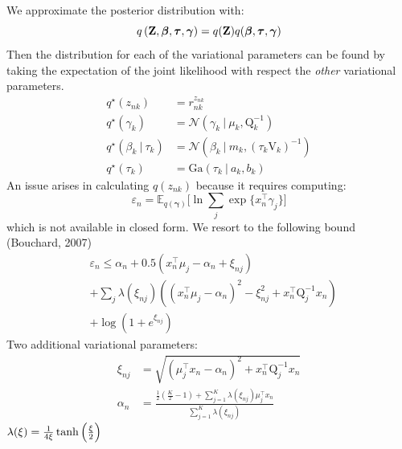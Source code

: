 \documentclass[a0paper,portrait]{baposter}
\newcommand{\tr}{\intercal}
\newcommand\given[1][]{\:#1\vert\:}
\newcommand{\boldbeta}{\boldsymbol\beta}
\newcommand{\boldgamma}{\boldsymbol\gamma}
\newcommand{\boldtau}{\boldsymbol\tau}
\newcommand{\pr}[1]{p \left( #1 \right)}
\begin{document}
\begin{poster}
{%
We approximate the posterior distribution with: \vspace{-3mm}
$$q \left( \mathbf{Z}, \boldbeta, \boldtau, \boldgamma \right) = q(\mathbf{Z}) q(\boldbeta, \boldtau, \boldgamma) \vspace{-1mm}$$
Then the distribution for each of the variational parameters can be found by taking the expectation of the joint likelihood with respect the \textit{other} variational parameters. 
\vspace{-2mm}
\setlength{\belowdisplayskip}{5pt}%
\begin{align*}
	q^{\star}(z_{nk}) &= r_{nk}^{z_{nk}} \\
 	q^{\star}(\gamma_k) &= \mathcal{N} \left(\gamma_k \given \mu_k, \mathrm{Q}_k^{-1} \right) \\
 	q^{\star}(\beta_k \given \tau_k) &= \mathcal{N}\left(\beta_k \given m_k, (\tau_k \mathrm{V}_k)^{-1} \right) \\
 	q^{\star}(\tau_k) &=  \mathrm{Ga}\left( \tau_k \given a_k, b_k \right)
\end{align*} 
An issue arises in calculating $q(z_{nk})$ because it requires computing: \vspace{-3mm}
$$\varepsilon_n = \mathbb{E}_{q(\boldsymbol\gamma)}\Bigg[\ln \sum_{j} \exp \{ x_n^{\tr} \gamma_j \}\Bigg]$$
which is not available in closed form. We resort to the following bound (Bouchard, 2007)  \vspace{-2mm}
\setlength{\belowdisplayskip}{8pt}%
\begin{align*}
	& \varepsilon_n  \leq  \alpha_n + 0.5\left(x_n^{\tr}\mu_j - \alpha_n + \xi_{nj}\right) \\[0.05ex] 
	& + \sum_{j}  \lambda(\xi_{nj}) \left( (x_n^{\tr} \mu_j - \alpha_n)^2 - \xi_{nj}^2 + x_n^{\tr} \mathrm{Q}_j^{-1} x_n \right) \\[0.05ex] 
	& + \log( 1 + e^{\xi_{nj}}) 
\end{align*}
Two additional variational parameters: \vspace{-1mm}
\setlength{\belowdisplayskip}{3pt}%
\begin{align*}
    \xi_{nj} & = \sqrt{\left(\mu_j^{\intercal}x_n - \alpha_n \right)^2 + x_n^{\intercal} \mathrm{Q}_j^{-1} x_n} \\[0.9ex]
    \alpha_n & = \frac{\frac{1}{2}\left( \frac{K}{2} - 1\right) + \sum_{j = 1}^K \lambda \left( \xi_{nj} \right)\mu_j^{\intercal} x_n}{\sum_{j=1}^{K} \lambda \left( \xi_{nj}\right)} 
\end{align*}
$\vspace{-2mm} \lambda(\xi) = \frac{1}{4\xi} \tanh \left( \frac{\xi}{2} \right)$ \\

}
\end{poster}
\end{document}
